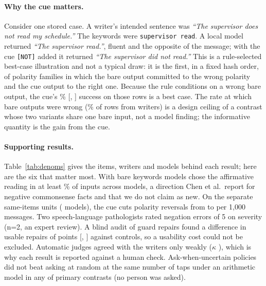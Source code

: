 \paragraph{Why the cue matters.}
Consider one stored case. A writer's intended sentence was \emph{``The supervisor does not read my schedule.''} The keywords were \texttt{supervisor read}. A local model returned \emph{``The supervisor read.''}, fluent and the opposite of the message; with the cue \texttt{[NOT]} added it returned \emph{``The supervisor did not read.''} This is a rule-selected best-case illustration and not a typical draw: it is the first, in a fixed hash order, of \jmexPolFamilies{} polarity families in which the bare output committed to the wrong polarity and the cue output to the right one. Because the rule conditions on a wrong bare output, the cue's \jmexPolChipMatch{}\% [\jmexPolChipMatchLo{}, \jmexPolChipMatchHi{}] success on those \jmexPolChipMatchN{} rows is a best case. The rate at which bare outputs were wrong (\jmexPolWrong{}\% of \jmexPolWrongN{} rows from \jmexPolWriters{} writers) is a design ceiling of a contrast whose two variants share one bare input, not a model finding; the informative quantity is the gain from the cue.

\paragraph{Supporting results.}
Table~\ref{tab:denoms} gives the items, writers and models behind each result; here are the six that matter most. With bare keywords models chose the affirmative reading in at least \jmbreadthMinAff{}\% of inputs across \jmbreadthModels{} models, a direction Chen et al.\ report for negative commonsense facts \cite{chen2023say} and that we do not claim as new. On the separate \jmfOneUnits{} same-items units (\jmfOneModels{} models), the cue cuts polarity reversals from \jmfOneRevPolBare{} to \jmfOneRevPolChip{} per 1,000 messages. Two speech-language pathologists rated negation errors \jmslpNegSeverity{} of 5 on severity (n=2, an expert review). A blind audit of guard repairs found a difference in usable repairs of \jmpOneSevenDiffUsable{} points [\jmpOneSevenDiffUsableLo{}, \jmpOneSevenDiffUsableHi{}] against controls, so a usability cost could not be excluded. Automatic judges agreed with the writers only weakly ($\kappa$ \jmpOneEightKappa{}), which is why each result is reported against a human check. Ask-when-uncertain policies did not beat asking at random at the same number of taps under an arithmetic model in any of \jmaskPrimaryN{} primary contrasts (no person was asked).

